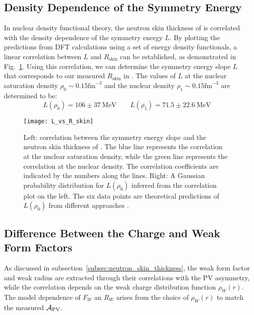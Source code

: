 \subsection{Density Dependence of the Symmetry Energy}
In nuclear density functional theory, the neutron skin thickness of \Pb is 
correlated with the density dependence of the symmetry energy $L$. 
By plotting the predictions from DFT calculations using a set of energy density 
functionals, a linear correlation between $L$ and $R_{\text{skin}}$ can be established,
as demonstrated in Fig.~\ref{fig:L_vs_R_skin}. Using this correlation, we can determine
the symmetry energy slope $L$ that corresponds to our measured $R_{\text{skin}}$ in \Pb. 
The values of $L$ at the nuclear saturation density 
$\rho_0 \sim 0.15 \mathrm{fm}^{-3}$ and the nuclear density $\rho_1 \sim 0.15 \mathrm{fm}^{-3}$ 
are determined to be:
\begin{equation}
    L(\rho_0) = 106 \pm 37 \ \mathrm{MeV}	\qquad L(\rho_1) = 71.5 \pm 22.6 \ \mathrm{MeV}
\end{equation}
\begin{figure}[!h]
    \centering
    \texttt{[image: L\_vs\_R\_skin]}
    \caption[Correlation plot between L and Rskin]
    {Left: correlation between the symmetry energy slope and the neutron skin thickness of \Pb.
    The blue line represents the correlation at the nuclear saturation density,
    while the green line represents the correlation at the nuclear density.
    The correlation coefficients are indicated by the numbers along the lines.
    Right: A Gaussian probability distribution for $L(\rho_0)$ inferred from 
    the correlation plot on the left. The six data points are theoretical
    predictions of $L(\rho_0)$ from different approaches \cite{PhysRevLett.126.172503}.
    }
    \label{fig:L_vs_R_skin}
\end{figure}
\subsection{Difference Between the Charge and Weak Form Factors}
As discussed in subsection~\ref{subsec:neutron_skin_thickness}, the weak form factor
and weak radius are extracted through their correlations with the PV asymmetry,
while the correlation depends on the weak charge distribution function $\rho_W(r)$.
The model dependence of $F_W$ an $R_W$ arises from the choice of $\rho_W(r)$ to match the
measured $\mathcal{A}_{\text{PV}}$. 


